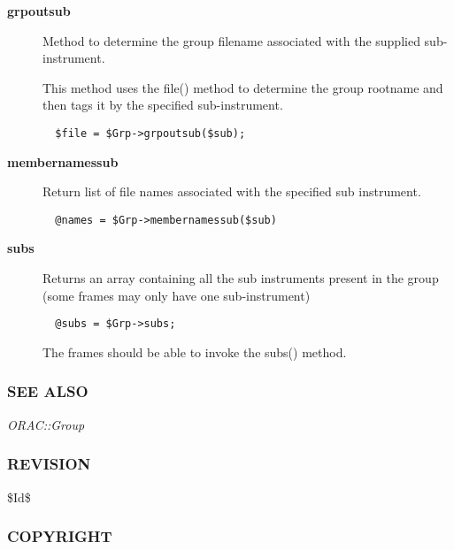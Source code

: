 \begin{description}

\item[{\textbf{grpoutsub}}] \mbox{}

Method to determine the group filename associated with
the supplied sub-instrument.



This method uses the file() method to determine the
group rootname and then tags it by the specified sub-instrument.

\begin{verbatim}
  $file = $Grp->grpoutsub($sub);
\end{verbatim}

\item[{\textbf{membernamessub}}] \mbox{}

Return list of file names associated with the specified
sub instrument.

\begin{verbatim}
  @names = $Grp->membernamessub($sub)
\end{verbatim}

\item[{\textbf{subs}}] \mbox{}

Returns an array containing all the sub instruments present
in the group (some frames may only have one sub-instrument)

\begin{verbatim}
  @subs = $Grp->subs;
\end{verbatim}


The frames should be able to invoke the subs() method.

\end{description}
\subsubsection*{SEE ALSO\label{ORAC::Group::SCUBA_SEE_ALSO}}


\emph{ORAC::Group}

\subsubsection*{REVISION\label{ORAC::Group::SCUBA_REVISION}}


\$Id\$

\subsubsection*{COPYRIGHT\label{ORAC::Group::SCUBA_COPYRIGHT}}


